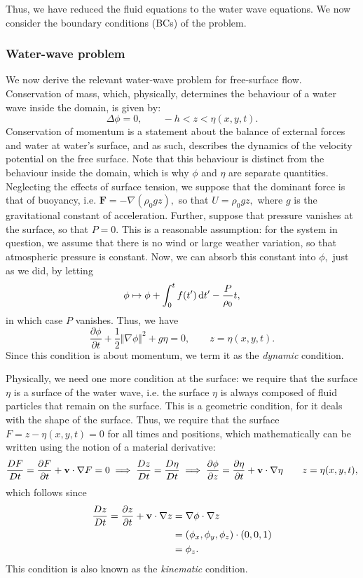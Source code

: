 \documentclass[10pt,reqno,oneside,a4paper]{article}
\begin{document}
Thus, we have reduced the fluid equations to the water wave equations. We now consider the boundary conditions (BCs) of the problem.

\subsubsection{Water-wave problem}
We now derive the relevant water-wave problem for free-surface flow. Conservation of mass, which, physically, determines the behaviour of a water wave inside the domain, is given by:
\[
\Delta \phi = 0, \qquad -h <z < \eta(x,y,t).
\]
Conservation of momentum is a statement about the balance of external forces and water at water's surface, and as such, describes the dynamics of the velocity potential on the free surface. Note that this behaviour is distinct from the behaviour inside the domain, which is why $\phi$ and $\eta$ are separate quantities. Neglecting the effects of surface tension, we suppose that the dominant force is that of buoyancy, i.e. $\textbf{F} = - \nabla(\rho_0 gz),$ so that $U = \rho_0 g z,$ where $g$ is the gravitational constant of acceleration. Further, suppose that pressure vanishes at the surface, so that $P = 0.$ This is a reasonable assumption: for the system in question, we assume that there is no wind or large weather variation, so that atmospheric pressure is constant. Now, we can absorb this constant into $\phi,$ just as we did, by letting 
\[ 
\phi \mapsto \phi + \int^t_0 f(t') \,\mathrm{d} t' - \frac{P}{\rho_0}t,
\]
in which case $P$ vanishes. Thus, we have 
\[ 
\frac{\partial \phi}{\partial t} + \frac{1}{2} \Vert \nabla \phi \Vert^2 + g \eta = 0, \qquad z = \eta(x,y,t).
\]
Since this condition is about momentum, we term it as the \textit{dynamic} condition. 

Physically, we need one more condition at the surface: we require that the surface $\eta$ is a surface of the water wave, i.e. the surface $\eta$ is always composed of fluid particles that remain on the surface. This is a geometric condition, for it deals with the shape of the surface. Thus, we require that the surface $F = z - \eta(x,y,t) = 0 $ for all times and positions, which mathematically can be written using the notion of a material derivative:
\[ 
\frac{DF}{Dt} = \frac{\partial F}{\partial t} + {\bf v} \cdot \nabla F = 0 \implies \frac{Dz}{Dt} = \frac{D\eta}{Dt}  \implies \frac{\partial \phi}{\partial z} =  \frac{\partial \eta}{\partial t} + {\bf v} \cdot \nabla \eta \qquad z = \eta(x,y,t),
\]
which follows since
\begin{align*}
\dfrac{Dz}{Dt} = \dfrac{\partial z}{\partial t} + {\bf v} \cdot \nabla z &= \nabla \phi \cdot \nabla z \\
&= (\phi_x, \phi_y, \phi_z) \cdot (0,0,1) \\
&= \phi_z.
\end{align*}
This condition is also known as the \textit{kinematic} condition. 
\end{document}
